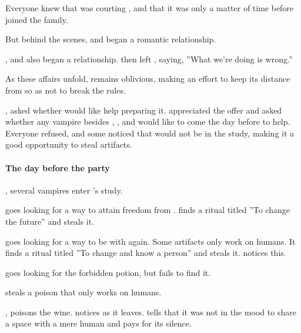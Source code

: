 Everyone knew that  was courting , and that it was only a matter of time before  joined the family.

But behind the scenes,  and  began a romantic relationship.

,  and  also began a relationship.  then left , saying, ''What we're doing is wrong.''

As these affairs unfold,  remains oblivious, making an effort to keep its distance from  so as not to break the rules.

,  asked whether  would like help preparing it.  appreciated the offer and asked whether any vampire besides , , and  would like to come the day before to help. Everyone refused, and some noticed that  would not be in the study, making it a good opportunity to steal artifacts.

\paragraph{The day before the party}

, several vampires enter 's study.

 goes looking for a way to attain freedom from .  finds a ritual titled ''To change the future'' and steals it.

 goes looking for a way to be with  again. Some artifacts only work on humans. It finds a ritual titled ''To change and know a person'' and steals it.  notices this.

 goes looking for the forbidden potion, but fails to find it.

 steals a poison that only works on humans.

,  poisons the wine.  notices  as it leaves.  tells  that it was not in the mood to share a space with a mere human and pays  for its silence.

